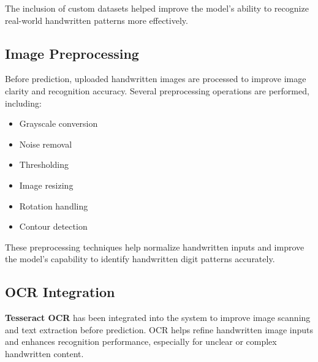 \documentclass[12pt,a4paper]{article}
\begin{document}
\noindent
The inclusion of custom datasets helped improve the model's ability to recognize real-world handwritten patterns more effectively.

\vspace{0.4cm}


\subsection{Image Preprocessing}

\vspace{0.2cm}

\noindent
Before prediction, uploaded handwritten images are processed to improve image clarity and recognition accuracy. Several preprocessing operations are performed, including:

\begin{itemize}
\item {Grayscale conversion}
\item {Noise removal}
\item {Thresholding}
\item {Image resizing}
\item {Rotation handling}
\item {Contour detection}
\end{itemize}

\vspace{0.2cm}

\noindent
These preprocessing techniques help normalize handwritten inputs and improve the model's capability to identify handwritten digit patterns accurately.

\vspace{0.4cm}


\subsection{OCR Integration}

\vspace{0.2cm}

\noindent
\textbf{Tesseract OCR} has been integrated into the system to improve image scanning and text extraction before prediction. OCR helps refine handwritten image inputs and enhances recognition performance, especially for unclear or complex handwritten content.

\vspace{0.4cm}
\end{document}
